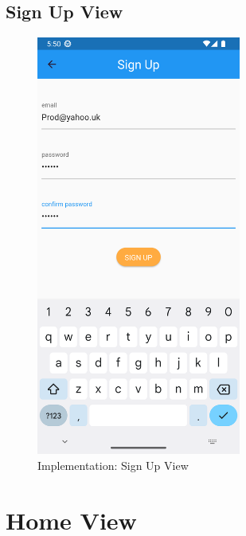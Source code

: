 \documentclass[../thesis.tex]{subfiles}
\begin{document}
\subsection{Sign Up View}
\begin{figure}[H]
    \centering
    \includegraphics[width=0.60\textwidth]{images/SignUpSceren.png}
    \caption{Implementation: Sign Up View}
    \label{fig:SignUpSceren}
\end{figure}

\section{Home View}
\end{document}

